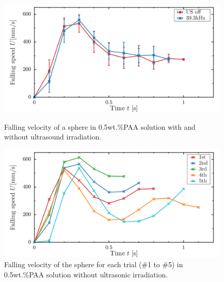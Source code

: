 \begin{figure}[ht]
    \centering
    \includegraphics[width=12cm,clip]{./4-Results/s0.5.png}
    \caption{Falling velocity of a sphere in 0.5wt.\%PAA solution with and without ultrasound irradiation.}
    \label{fig:0.5PAA-falling}
    \centering
    \includegraphics[width=12cm,clip]{4-Results/s0.5-0-1-5.png}
    \caption{Falling velocity of the sphere for each trial (\#1 to \#5) in 0.5wt.\%PAA solution without ultrasonic irradiation.}
    \label{fig:0.5PAA-falling1-5}
\end{figure}
